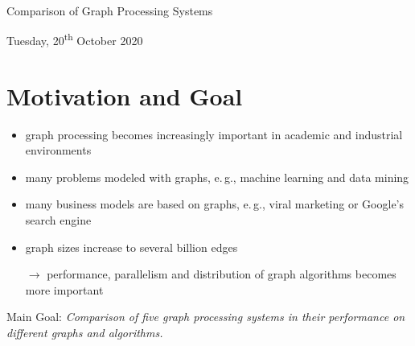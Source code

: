 \documentclass{meetings}
\author{S. König, L. Matzner, F. Rollbühler and J. Schmid}
\date{Tuesday, 20\textsuperscript{th} October 2020}
\begin{document}
\thispagestyle{empty}
\ 
\vfill

\begin{center}
	\huge\sffamily\color{heading} Comparison of Graph Processing Systems

	\vfill

	\normalsize Tuesday, 20\textsuperscript{th} October 2020
\end{center}


\vfill

\section{Motivation and Goal}
\sffamily
\begin{center}

	\vfill

	\begin{itemize}
		\item graph processing becomes increasingly important in academic and industrial environments
		\item many problems modeled with graphs, e.\,g.,\xspace machine learning and data mining
		\item many business models are based on graphs, e.\,g.,\xspace viral marketing or Google’s search engine
		\item graph sizes increase to several billion edges
		\item[$\rightarrow$] performance, parallelism and distribution of graph algorithms becomes more important
	\end{itemize}

	\vfill

	\begin{minipage}{0.6\linewidth}
		\centering
		Main Goal: \itshape  Comparison of five graph processing systems in their performance on different graphs and algorithms.
	\end{minipage}

	\vfill
\end{center}
\end{document}

